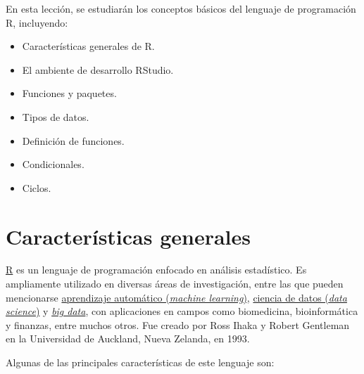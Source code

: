 \documentclass[
  letterpaper,
  DIV=11,
  numbers=noendperiod]{scrreprt}
\providecommand{\tightlist}{%
  \setlength{\itemsep}{0pt}\setlength{\parskip}{0pt}}\usepackage{longtable,booktabs,array}
\begin{document}
En esta lección, se estudiarán los conceptos básicos del lenguaje de
programación R, incluyendo:

\begin{itemize}
\tightlist
\item
  Características generales de R.
\item
  El ambiente de desarrollo RStudio.
\item
  Funciones y paquetes.
\item
  Tipos de datos.
\item
  Definición de funciones.
\item
  Condicionales.
\item
  Ciclos.
\end{itemize}

\hypertarget{caracteruxedsticas-generales}{%
\section{Características generales}\label{caracteruxedsticas-generales}}

\href{https://www.r-project.org/}{R} es un lenguaje de programación
enfocado en análisis estadístico. Es ampliamente utilizado en diversas
áreas de investigación, entre las que pueden mencionarse
\href{https://en.wikipedia.org/wiki/Machine_learning}{aprendizaje
automático (\emph{machine learning})},
\href{https://en.wikipedia.org/wiki/Data_science}{ciencia de datos
(\emph{data science})} y
\href{https://en.wikipedia.org/wiki/Big_data}{\emph{big data}}, con
aplicaciones en campos como biomedicina, bioinformática y finanzas,
entre muchos otros. Fue creado por Ross Ihaka y Robert Gentleman en la
Universidad de Auckland, Nueva Zelanda, en 1993.

Algunas de las principales características de este lenguaje son:
\end{document}
